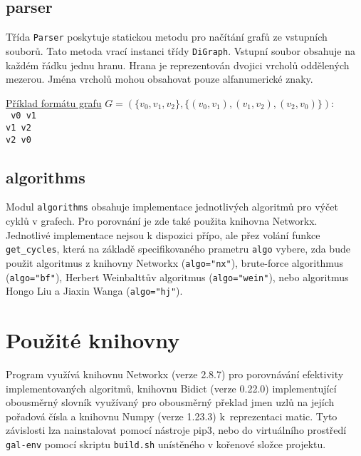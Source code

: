         \subsection{parser}
            Třída \texttt{Parser} poskytuje statickou metodu pro načítání grafů ze vstupních souborů. Tato metoda vrací instanci třídy \texttt{DiGraph}. Vstupní soubor obsahuje na každém řádku jednu hranu. Hrana je reprezentován dvojici vrcholů oddělených mezerou. Jména vrcholů mohou obsahovat pouze alfanumerické znaky.

            \vspace*{1em}
            \noindent \underline{Příklad formátu grafu} $G = (\{v_0, v_1, v_2\}, \{(v_0, v_1), (v_1, v_2), (v_2, v_0)\})$:
            \vspace*{0.5em}\\
            \noindent\texttt{
                v0 v1\\
                v1 v2\\
                v2 v0\\
            }

        \subsection{algorithms}
            Modul \texttt{algorithms} obsahuje implementace jednotlivých algoritmů pro výčet cyklů v grafech. Pro porovnání je zde také použita knihovna Networkx. Jednotlivé implementace nejsou k dispozici přípo, ale přez volání funkce \texttt{get\_cycles}, která na základě specifikovaného prametru \texttt{algo} vybere, zda bude použit algoritmus z knihovny Networkx \cite{Johnson_1975} (\texttt{algo="nx"}), brute-force algorithmus \cite[str. 287]{Book_algo} (\texttt{algo="bf"}), Herbert Weinbalttův algoritmus \cite{A_new_search_algorithm} (\texttt{algo="wein"}), nebo algoritmus Hongo Liu a Jiaxin Wanga \cite{A_new_way_to_enumerate_cycles_in_graph} (\texttt{algo="hj"}).

    \newpage

    \section{Použité knihovny}
        Program využívá knihovnu Networkx (verze 2.8.7) pro porovnávání efektivity implementovaných algoritmů, knihovnu Bidict (verze 0.22.0) implementující obousměrný slovník využívaný pro obousměrný překlad jmen uzlů na jejích pořadová čísla a knihovnu Numpy (verze 1.23.3) k~reprezentaci matic. Tyto závislosti lza nainstalovat pomocí nástroje pip3, nebo do virtuálního prostředí \texttt{gal-env} pomocí skriptu \texttt{build.sh} unístěného v kořenové složce projektu.

